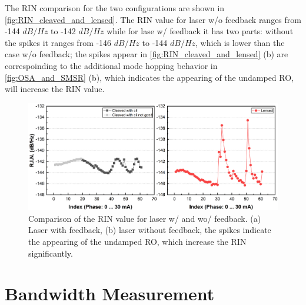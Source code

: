 The RIN comparison for the two configurations are shown in \autoref{fig:RIN_cleaved_and_lensed}. The RIN value for laser w/o feedback ranges from -144 $dB/Hz$ to -142 $dB/Hz$ while for lase w/ feedback it has two parts: without the spikes it ranges from -146 $dB/Hz$ to -144 $dB/Hz$, which is lower than the case w/o feedback; the spikes appear in \autoref{fig:RIN_cleaved_and_lensed} (b) are correspoinding to the additional mode hopping behavior in \autoref{fig:OSA_and_SMSR} (b), which indicates the appearing of the undamped RO, will increase the RIN value.

\begin{figure}[ht]
    \centering
    \includegraphics[width=\linewidth]{figures/RIN_cleaved_and_lensed.png}
    \caption{Comparison of the RIN value for laser w/ and wo/ feedback. (a) Laser with feedback, (b) laser without feedback, the spikes indicate the appearing of the undamped RO, which increase the RIN significantly.}
    \label{fig:RIN_cleaved_and_lensed}
\end{figure}

\section{Bandwidth Measurement}\label{sec:bandwidth_measurement}
